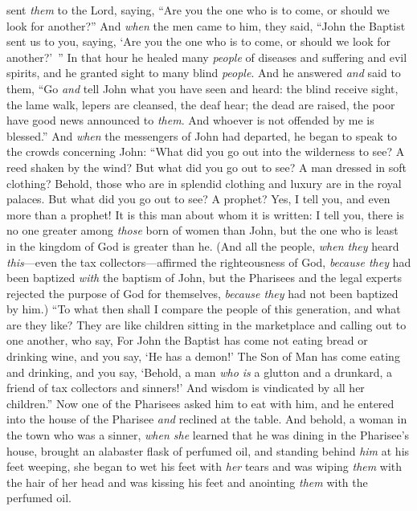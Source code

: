 \begin{biblechapter}
\verse sent \textit{them} to the Lord, saying, “Are you the one who is to come, or should we look for another?”
\verse And \textit{when} the men came to him, they said, “John the Baptist sent us to you, saying, ‘Are you the one who is to come, or should we look for another?’ ”
\verse In that hour he healed many \textit{people} of diseases and suffering and evil spirits, and he granted sight to many blind \textit{people}.
\verse And he answered \textit{and} said to them, “Go \textit{and} tell John what you have seen and heard: the blind receive sight, the lame walk, lepers are cleansed, the deaf hear; the dead are raised, the poor have good news announced to \textit{them}.
\verse And whoever is not offended by me is blessed.”
\verse And \textit{when} the messengers of John had departed, he began to speak to the crowds concerning John: “What did you go out into the wilderness to see? A reed shaken by the wind?
\verse But what did you go out to see? A man dressed in soft clothing? Behold, those who are in splendid clothing and luxury are in the royal palaces.
\verse But what did you go out to see? A prophet? Yes, I tell you, and even more than a prophet!
\verse It is this man about whom it is written:
\verse I tell you, there is no one greater among \textit{those} born of women than John, but the one who is least in the kingdom of God is greater than he.
\verse (And all the people, \textit{when they} heard \textit{this}—even the tax collectors—affirmed the righteousness of God, \textit{because they} had been baptized \textit{with} the baptism of John,
\verse but the Pharisees and the legal experts rejected the purpose of God for themselves, \textit{because they} had not been baptized by him.)
\verse “To what then shall I compare the people of this generation, and what are they like?
\verse They are like children sitting in the marketplace and calling out to one another, who say,
\verse For John the Baptist has come not eating bread or drinking wine, and you say, ‘He has a demon!’
\verse The Son of Man has come eating and drinking, and you say, ‘Behold, a man \textit{who is} a glutton and a drunkard, a friend of tax collectors and sinners!’
\verse And wisdom is vindicated by all her children.”
 Now one of the Pharisees asked him to eat with him, and he entered into the house of the Pharisee \textit{and} reclined at the table.
\verse And behold, a woman in the town who was a sinner, \textit{when she} learned that he was dining in the Pharisee’s house, brought an alabaster flask of perfumed oil,
\verse and standing behind \textit{him} at his feet weeping, she began to wet his feet with \textit{her} tears and was wiping \textit{them} with the hair of her head and was kissing his feet and anointing \textit{them} with the perfumed oil.

\end{biblechapter}
